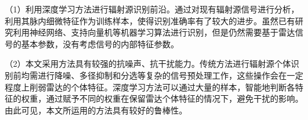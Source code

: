 （1）利用深度学习方法进行辐射源识别前沿。通过对现有辐射源信号进行分析，利用其脉内细微特征作为训练样本，使得识别准确率有了较大的进步。虽然已有研究利用神经网络、支持向量机等机器学习算法进行识别，但是仍然需要基于雷达信号的基本参数，没有考虑信号的内部特征参数。

（2）本文采用方法具有较强的抗噪声、抗干扰能力。传统方法进行辐射源个体识别前均需进行降噪、多径抑制和分选等复杂的信号预处理工作，这些操作会在一定程度上削弱雷达的个体特征。深度学习方法可以通过大量的样本，智能地判断各特征的权重，通过赋予不同的权重在保留雷达个体特征的情况下，避免干扰的影响。由此可见，本文所运用的方法具有较好的鲁棒性。




